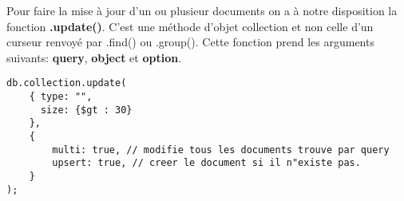     Pour faire la mise à jour d'un ou plusieur documents on a à notre disposition la fonction \textbf{.update()}. C'est une méthode d'objet collection et non celle d'un curseur renvoyé par .find() ou .group(). Cette fonction prend les arguments suivants: \textbf{query}, \textbf{object} et \textbf{option}. \newline

    \begin{lstlisting}[language=Mongo, caption=fonction update().]
db.collection.update(
    { type: "",
      size: {$gt : 30} 
    },
    {
        multi: true, // modifie tous les documents trouve par query
        upsert: true, // creer le document si il n"existe pas.
    }
);
    \end{lstlisting}
